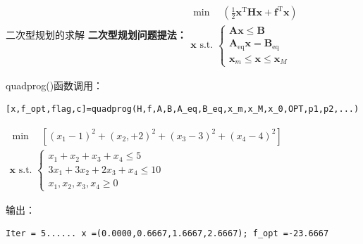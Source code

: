 \documentclass[10pt]{beamer}
\begin{document}
		\begin{frame}[fragile]{二次型规划的求解}
	\textbf{二次型规划问题提法：}$
\begin{array}{l}
\min \quad \left(\frac{1}{2} \mathbf{x}^{\mathrm{T}} \mathbf{H} \mathbf{x}+\mathbf{f}^{\mathrm{T}} \mathbf{x}\right)\\
\mathbf{x} \text { s.t. }\left\{\begin{array}{l}
\mathbf{A} \mathbf{x} \leqslant \mathbf{B} \\
\mathbf{A}_{\mathrm{eq}} \mathbf{x}=\mathbf{B}_{\mathrm{eq}} \\
\mathbf{x}_{m} \leqslant \mathbf{x} \leqslant \mathbf{x}_{M}
\end{array}\right.
\end{array}$

	\begin{block}{quadprog()函数调用：}
\begin{lstlisting}
[x,f_opt,flag,c]=quadprog(H,f,A,B,A_eq,B_eq,x_m,x_M,x_0,OPT,p1,p2,...)
\end{lstlisting}
	\end{block}	

\begin{example}[6-18]
	$\begin{array}{l}
	\min \quad \left[\left(x_{1}-1\right)^{2}+\left(x_{2},+2\right)^{2}+\left(x_{3}-3\right)^{2}+\left(x_{4}-4\right)^{2}\right]\\
	\mathbf{x} \text { s.t. }\left\{\begin{array}{l}
	x_{1}+x_{2}+x_{3}+x_{4} \leqslant 5 \\
	3 x_{1}+3 x_{2}+2 x_{3}+x_{4} \leq 10 \\
	x_{1}, x_{2}, x_{3}, x_{4} \geqslant 0
	\end{array}\right.
	\end{array}
	$
\end{example}

\begin{block}{输出：}
	\begin{lstlisting}
Iter = 5...... x =(0.0000,0.6667,1.6667,2.6667); f_opt =-23.6667\end{lstlisting}
\end{block}	
			
		\end{frame}
\end{document}
